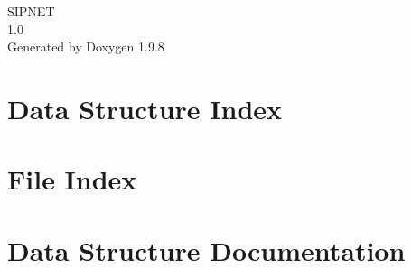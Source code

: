\documentclass[twoside]{book}
\newcommand{\+}{\discretionary{\mbox{\scriptsize$\hookleftarrow$}}{}{}}
\newcommand{\clearemptydoublepage}{%
    \newpage{\pagestyle{empty}\cleardoublepage}%
  }
\begin{document}
  \raggedbottom
  \begin{titlepage}
  \vspace*{7cm}
  \begin{center}%
  {\Large SIPNET}\\
  [1ex]\large 1.\+0 \\
  \vspace*{1cm}
  {\large Generated by Doxygen 1.9.8}\\
  \end{center}
  \end{titlepage}
  \clearemptydoublepage
  \tableofcontents
  \clearemptydoublepage

\chapter{Data Structure Index}

\chapter{File Index}

\chapter{Data Structure Documentation}






















\end{document}

